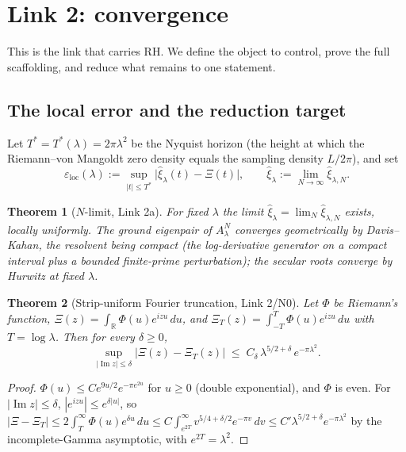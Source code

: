 \documentclass[11pt]{amsart}
\newtheorem{theorem}{Theorem}[section]
\theoremstyle{definition}
\theoremstyle{remark}
\newcommand{\RH}{\mathrm{RH}}
\newcommand{\bbR}{\mathbb{R}}
\newcommand{\xih}{\widehat{\xi}}
\DeclareMathOperator{\Imag}{Im}
\begin{document}
\section{Link 2: convergence}\label{sec:e2}

This is the link that carries $\RH$. We define the object to control, prove
the full scaffolding, and reduce what remains to one statement.

\subsection{The local error and the reduction target}
Let $T^\ast=T^\ast(\lambda)=2\pi\lambda^2$ be the Nyquist horizon (the height
at which the Riemann--von Mangoldt zero density equals the sampling density
$L/2\pi$), and set
\begin{equation}\label{eq:epsloc}
\varepsilon_{\mathrm{loc}}(\lambda):=\sup_{|t|\leq T^\ast}
\big|\xih_{\lambda}(t)-\Xi(t)\big|,
\qquad \xih_{\lambda}:=\lim_{N\to\infty}\xih_{\lambda,N}.
\end{equation}

\begin{theorem}[$N$-limit, Link 2a]\label{thm:e2a}
For fixed $\lambda$ the limit $\xih_\lambda=\lim_N\xih_{\lambda,N}$ exists,
locally uniformly. The ground eigenpair of $A_\lambda^N$ converges
geometrically by Davis--Kahan, the resolvent being compact (the log-derivative
generator on a compact interval plus a bounded finite-prime perturbation);
the secular roots converge by Hurwitz at fixed $\lambda$.
\end{theorem}

\begin{theorem}[Strip-uniform Fourier truncation, Link 2/N0]\label{thm:fourier}
Let $\Phi$ be Riemann's function, $\Xi(z)=\int_{\bbR}\Phi(u)e^{izu}\,du$, and
$\Xi_T(z)=\int_{-T}^{T}\Phi(u)e^{izu}\,du$ with $T=\log\lambda$. Then for
every $\delta\geq0$,
\begin{equation}\label{eq:fourier}
\sup_{|\Imag z|\leq\delta}\big|\Xi(z)-\Xi_T(z)\big|
\;\leq\; C_\delta\,\lambda^{5/2+\delta}\,e^{-\pi\lambda^2}.
\end{equation}
\end{theorem}
\begin{proof}
$\Phi(u)\leq Ce^{9u/2}e^{-\pi e^{2u}}$ for $u\geq0$ (double exponential), and
$\Phi$ is even. For $|\Imag z|\leq\delta$, $|e^{izu}|\leq e^{\delta|u|}$, so
$|\Xi-\Xi_T|\leq2\int_T^\infty\Phi(u)e^{\delta u}\,du
\leq C\int_{e^{2T}}^\infty v^{5/4+\delta/2}e^{-\pi v}\,dv
\leq C'\lambda^{5/2+\delta}e^{-\pi\lambda^2}$
by the incomplete-Gamma asymptotic, with $e^{2T}=\lambda^2$.
\end{proof}
\end{document}
